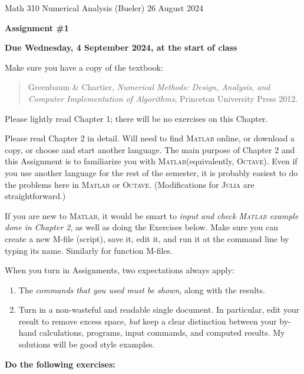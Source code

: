 \documentclass[12pt]{amsart}
\newcommand{\Julia}{\textsc{Julia}\xspace}
\newcommand{\Matlab}{\textsc{Matlab}\xspace}
\newcommand{\Octave}{\textsc{Octave}\xspace}
\begin{document}
\scriptsize \noindent Math 310 Numerical Analysis (Bueler) \hfill 26 August 2024
\normalsize

\medskip\bigskip

\Large\centerline{\textbf{Assignment \#1}}
\large
\bigskip

\centerline{\textbf{Due Wednesday, 4 September 2024, at the start of class}}
\bigskip
\normalsize

\thispagestyle{empty}

\bigskip
\noindent Make sure you have a copy of the textbook:

\begin{quote}
Greenbaum \& Chartier, \emph{Numerical Methods: Design, Analysis, and Computer Implementation of Algorithms}, Princeton University Press 2012.
\end{quote}

\bigskip
\noindent Please lightly read Chapter 1; there will be no exercises on this Chapter.

\bigskip
\noindent Please read Chapter 2 in detail.  Will need to find \Matlab online, or download a copy, or choose and start another language.  The main purpose of Chapter 2 and this Assignment is to familiarize you with \Matlab (equivalently, \Octave).  Even if you use another language for the rest of the semester, it is probably easiest to do the problems here in \Matlab or \Octave.  (Modifications for \Julia are straightforward.)

\bigskip
\noindent If you are new to \Matlab, it would be smart to \emph{input and check \Matlab example done in Chapter 2}, as well as doing the Exercises below.  Make sure you can create a new M-file (script), save it, edit it, and run it at the command line by typing its name.  Similarly for function M-files.

\bigskip
\noindent When you turn in Assignments, two expectations always apply:
\renewcommand{\labelenumi}{\arabic{enumi}.\,}
\begin{enumerate}
\item The \emph{commands that you used must be shown}, along with the results.
\item Turn in a non-wasteful and readable single document.  In particular, edit your result to remove excess space, \emph{but} keep a clear distinction between your by-hand calculations, programs, input commands, and computed results.  My solutions will be good style examples.
\end{enumerate}

\bigskip\bigskip
\noindent \textbf{Do the following exercises:}
\end{document}
